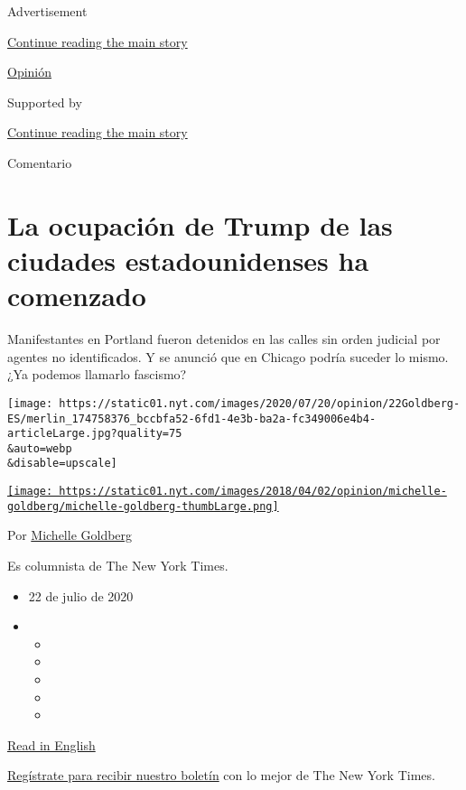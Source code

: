 Advertisement

\protect\hyperlink{after-top}{Continue reading the main story}

\href{/es/section/opinion}{Opinión}

Supported by

\protect\hyperlink{after-sponsor}{Continue reading the main story}

Comentario

\hypertarget{la-ocupaciuxf3n-de-trump-de-las-ciudades-estadounidenses-ha-comenzado}{%
\section{La ocupación de Trump de las ciudades estadounidenses ha
comenzado}\label{la-ocupaciuxf3n-de-trump-de-las-ciudades-estadounidenses-ha-comenzado}}

Manifestantes en Portland fueron detenidos en las calles sin orden
judicial por agentes no identificados. Y se anunció que en Chicago
podría suceder lo mismo. ¿Ya podemos llamarlo fascismo?

\texttt{[image: https://static01.nyt.com/images/2020/07/20/opinion/22Goldberg-ES/merlin\_174758376\_bccbfa52-6fd1-4e3b-ba2a-fc349006e4b4-articleLarge.jpg?quality=75\\\&auto=webp\\\&disable=upscale]}

\href{https://www.nytimes.com/by/michelle-goldberg}{\texttt{[image: https://static01.nyt.com/images/2018/04/02/opinion/michelle-goldberg/michelle-goldberg-thumbLarge.png]}}

Por \href{https://www.nytimes.com/by/michelle-goldberg}{Michelle
Goldberg}

Es columnista de The New York Times.

\begin{itemize}
\item
  22 de julio de 2020
\item
  \begin{itemize}
  \item
  \item
  \item
  \item
  \item
  \end{itemize}
\end{itemize}

\href{https://www.nytimes.com/2020/07/20/opinion/portland-protests-trump.html}{Read
in English}

\href{https://www.nytimes.com/newsletters/el-times}{Regístrate para
recibir nuestro boletín} con lo mejor de The New York Times.

